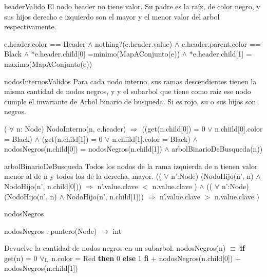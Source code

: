 \begin{DoxyParagraph}{header\-Valido}
\-El nodo header no tiene valor. \-Su padre es la raíz, de color negro, y sus hijos derecho e izquierdo son el mayor y el menor valor del arbol respectivamente.\par

\end{DoxyParagraph}
e.\-header.\-color == \-Header $\land$ nothing?(e.\-header.\-value) $\land$ e.\-header.\-parent.\-color == \-Black $\land$ $\ast$e.header.\-child\mbox{[}0\mbox{]} =minimo(\-Map\-A\-Conjunto(e)) $\land$ $\ast$e.header.\-child\mbox{[}1\mbox{]} = maximo(\-Map\-A\-Conjunto(e)) 

\begin{DoxyParagraph}{nodos\-Internos\-Validos}
\-Para cada nodo interno, sus ramas descendientes tienen la misma cantidad de nodos negros, y y el subarbol que tiene como raiz ese nodo cumple el invariante de \-Arbol binario de busqueda. \-Si es rojo, su o sus hijos son negros.
\end{DoxyParagraph}
( $\forall$ n\-: \-Node) \-Nodo\-Interno(n, e.\-header) $\Rightarrow$ ((get(n.\-child\mbox{[}0\mbox{]}) = 0 $\lor$ n.\-chiild\mbox{[}0\mbox{]}.color = \-Black) $\land$ (get(n.\-child\mbox{[}1\mbox{]}) = 0 $\lor$ n.\-chiild\mbox{[}1\mbox{]}.color = \-Black) $\land$ nodos\-Negros(n.\-child\mbox{[}0\mbox{]}) = nodos\-Negros(n.\-child\mbox{[}1\mbox{]}) $\land$ arbol\-Binario\-De\-Busqueda(n)) 

\begin{DoxyParagraph}{arbol\-Binario\-De\-Busqueda}
\-Todos los nodos de la rama izquierda de n tienen valor menor al de n y todos los de la derecha, mayor. (( $\forall$ n'\-:\-Node) (\-Nodo\-Hijo(n', n) $\land$ \-Nodo\-Hijo(n', n.\-child\mbox{[}0\mbox{]})) $\Rightarrow$ n'.value.\-clave $<$ n.\-value.\-clave ) $\land$ (( $\forall$ n'\-:\-Node) (\-Nodo\-Hijo(n', n) $\land$ \-Nodo\-Hijo(n', n.\-child\mbox{[}1\mbox{]})) $\Rightarrow$ n'.value.\-clave $>$ n.\-value.\-clave ) 
\end{DoxyParagraph}
\begin{DoxyParagraph}{nodos\-Negros}

\end{DoxyParagraph}
nodos\-Negros \-: puntero(\-Node) $\to$ int\par
 \-Devuelve la cantidad de nodos negros en un subarbol. nodos\-Negros(n) $\equiv$ {\bfseries if} get(n) = 0 $\lor_{\rm L}$ n.\-color = \-Red {\bfseries then} 0 {\bfseries else} 1 {\bfseries fi} + nodos\-Negros(n.\-child\mbox{[}0\mbox{]}) + nodos\-Negros(n.\-child\mbox{[}1\mbox{]}) 

